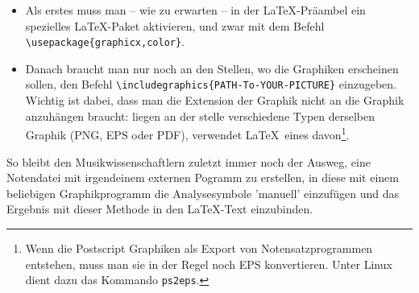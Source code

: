 \begin{itemize}
  \item Als erstes muss man -- wie zu erwarten -- in der \LaTeX-Präambel ein
  spezielles \LaTeX-Paket aktivieren, und zwar mit dem Befehl
  \texttt{\textbackslash{usepackage}\{graphicx,color\}}.
  \item Danach braucht man nur noch an den Stellen, wo die Graphiken erscheinen
  sollen, den Befehl
  \texttt{\textbackslash{includegraphics}\{PATH-To-YOUR-PICTURE\}} einzugeben.
  Wichtig ist dabei, dass man die Extension der Graphik nicht an die Graphik
  anzuhängen braucht: liegen an der stelle verschiedene Typen derselben Graphik
  (PNG, EPS oder PDF), verwendet \LaTeX\ eines davon\footnote{Wenn die Postscript
  Graphiken als Export von Notensatzprogrammen entstehen, muss man sie in der
  Regel noch EPS konvertieren. Unter Linux dient dazu das Kommando \texttt{ps2eps}.}.
\end{itemize}

So bleibt den Musikwissenschaftlern zuletzt immer noch der Ausweg, eine
Notendatei mit irgendeinem externen Pogramm zu erstellen, in diese mit einem
beliebigen Graphikprogramm die Analysesymbole 'manuell' einzufügen und das
Ergebnis mit dieser Methode in den \LaTeX-Text einzubinden.

% 
